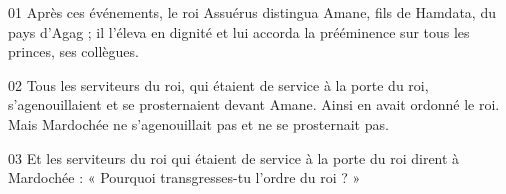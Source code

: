 01 Après ces événements, le roi Assuérus distingua Amane, fils de Hamdata, du pays d’Agag ; il l’éleva en dignité et lui accorda la prééminence sur tous les princes, ses collègues.

02 Tous les serviteurs du roi, qui étaient de service à la porte du roi, s’agenouillaient et se prosternaient devant Amane. Ainsi en avait ordonné le roi. Mais Mardochée ne s’agenouillait pas et ne se prosternait pas.

03 Et les serviteurs du roi qui étaient de service à la porte du roi dirent à Mardochée : « Pourquoi transgresses-tu l’ordre du roi ? »
